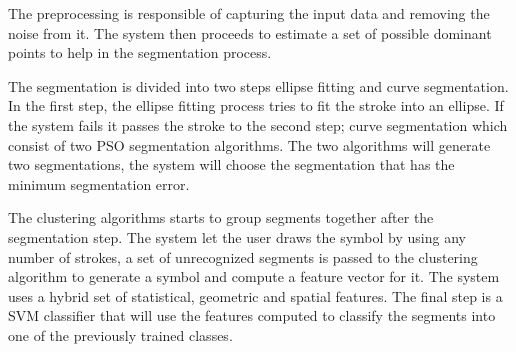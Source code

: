 \documentclass[a4paper,10pt]{IEEEconf}
\begin{document}
The preprocessing is responsible of capturing the input data and removing the noise from it. The system then proceeds to estimate a set of possible dominant points to help in the segmentation process. %
  
The segmentation is divided into two steps ellipse fitting and  curve segmentation. In the first step, the ellipse fitting process tries to fit the stroke into an ellipse. If the system fails it passes the stroke to the second step; curve segmentation which consist of two PSO segmentation algorithms. The two algorithms will generate two segmentations, the system will choose the segmentation that has the minimum segmentation error.%

 The clustering algorithms starts to group segments together after the segmentation step. The system let the user draws the symbol by using any number of strokes, a set of unrecognized segments is passed to the clustering algorithm to generate a symbol and compute a feature vector for it. The system uses a hybrid set of statistical, geometric and spatial features. The final step is a SVM classifier that will use the features computed to classify the segments into one of the previously trained classes. %
 
\end{document}
